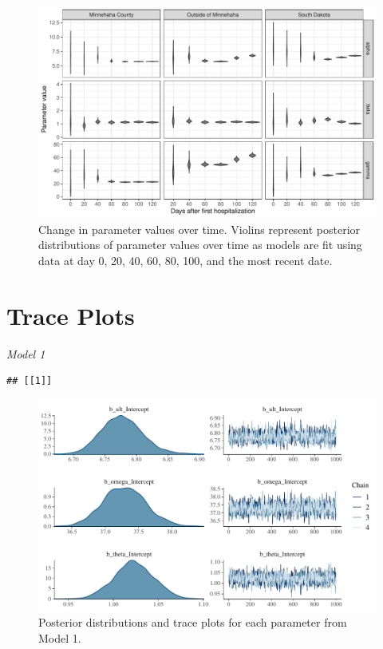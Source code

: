 \documentclass[
]{article}
\begin{document}
\begin{figure}
\centering
\includegraphics{manuscript_files/figure-latex/unnamed-chunk-7-1.pdf}
\caption{\label{fig:unnamed-chunk-7}Change in parameter values over time. Violins represent posterior distributions of parameter values over time as models are fit using data at day 0, 20, 40, 60, 80, 100, and the most recent date.\label{param_time_plot:plot}}
\end{figure}

\newpage

\FloatBarrier

\hypertarget{trace-plots}{%
\section{Trace Plots}\label{trace-plots}}

\emph{Model 1}

\begin{verbatim}
## [[1]]
\end{verbatim}

\begin{figure}
\centering
\includegraphics{manuscript_files/figure-latex/unnamed-chunk-8-1.pdf}
\caption{\label{fig:unnamed-chunk-8}Posterior distributions and trace plots for each parameter from Model 1.}
\end{figure}
\end{document}
